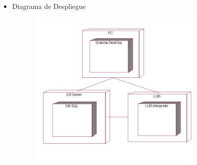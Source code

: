 \documentclass[12pt]{report}
\begin{document}
\begin{itemize}

\par


\vspace{\baselineskip}



\newpage

\vspace{\baselineskip}	\item {\fontsize{10pt}{12.0pt}\selectfont Diagrama de Despliegue\par}
\end{itemize}\par




\begin{figure}[H]
	\begin{Center}
		\includegraphics[width=3.98in,height=3.0in]{./media/image21.png}
	\end{Center}
\end{figure}



\par
\end{document}
